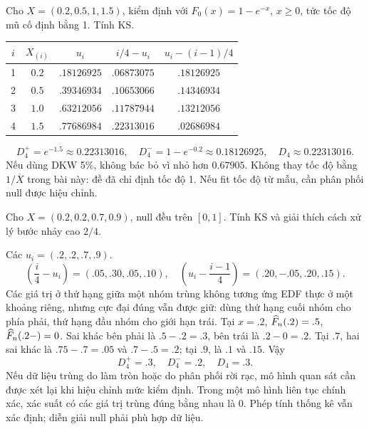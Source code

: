 \begin{exercise}
Cho $X=(0.2,0.5,1,1.5)$, kiểm định với $F_0(x)=1-e^{-x}$,
$x\geq0$, tức tốc độ mũ cố định bằng 1. Tính KS.
\end{exercise}
\begin{solution}
\begin{center}
\begin{tabular}{ccccc}
\toprule $i$ & $X_{(i)}$ & $u_i$ & $i/4-u_i$ & $u_i-(i-1)/4$\\\midrule
1 & $0.2$ & $.18126925$ & $.06873075$ & $.18126925$\\
2 & $0.5$ & $.39346934$ & $.10653066$ & $.14346934$\\
3 & $1.0$ & $.63212056$ & $.11787944$ & $.13212056$\\
4 & $1.5$ & $.77686984$ & $.22313016$ & $.02686984$\\\bottomrule
\end{tabular}
\end{center}
\[
\boxed{D_4^+=e^{-1.5}\approx0.22313016,\quad
D_4^-=1-e^{-0.2}\approx0.18126925,\quad D_4\approx0.22313016.}
\]
Nếu dùng DKW 5\%, không bác bỏ vì nhỏ hơn $0.67905$.
Không thay tốc độ bằng $1/\overline X$ trong bài này: đề đã chỉ định
tốc độ 1. Nếu fit tốc độ từ mẫu, cần phân phối null được hiệu chỉnh.
\end{solution}

\begin{exercise}
Cho $X=(0.2,0.2,0.7,0.9)$, null đều trên $[0,1]$.
Tính KS và giải thích cách xử lý bước nhảy cao $2/4$.
\end{exercise}
\begin{solution}
Các $u_i=(.2,.2,.7,.9)$.
\[
\left(\frac i4-u_i\right)=(.05,.30,.05,.10),
\quad
\left(u_i-\frac{i-1}4\right)=(.20,-.05,.20,.15).
\]
Các giá trị ở thứ hạng giữa một nhóm trùng không tương ứng EDF thực
ở một khoảng riêng, nhưng cực đại đúng vẫn được giữ: dùng thứ hạng
cuối nhóm cho phía phải, thứ hạng đầu nhóm cho giới hạn trái.
Tại $x=.2$, $\widehat F_n(.2)=.5$, $\widehat F_n(.2-)=0$.
Sai khác bên phải là $.5-.2=.3$, bên trái là $.2-0=.2$.
Tại $.7$, hai sai khác là $.75-.7=.05$ và $.7-.5=.2$;
tại $.9$, là $.1$ và $.15$. Vậy
\[
\boxed{D_4^+=.3,\quad D_4^-=.2,\quad D_4=.3.}
\]
Nếu dữ liệu trùng do làm tròn hoặc do phân phối rời rạc, mô hình quan
sát cần được xét lại khi hiệu chỉnh mức kiểm định. Trong một mô hình
liên tục chính xác, xác suất có các giá trị trùng đúng bằng nhau là 0.
Phép tính thống kê vẫn xác định; diễn giải null phải phù hợp dữ liệu.
\end{solution}

